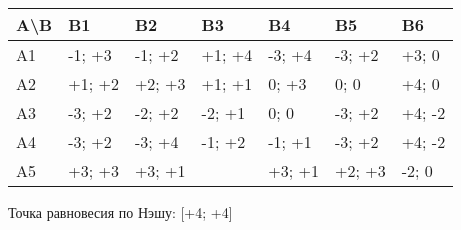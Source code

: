 \documentclass[12pt,a4paper]{article}
\begin{document}
\begin{table}[H]
        \centering
        
\begin{tabular}{|p{}|p{}|p{}|p{}|p{}|p{}|p{}|}
\hline 
 \textcolor[rgb]{0.82,0.01,0.11}{A}\textbackslash \textcolor[rgb]{0.29,0.56,0.89}{B} & \textcolor[rgb]{0.29,0.56,0.89}{B1} & \textcolor[rgb]{0.29,0.56,0.89}{B2} & \textcolor[rgb]{0.29,0.56,0.89}{B3} & \textcolor[rgb]{0.29,0.56,0.89}{B4} & \textcolor[rgb]{0.29,0.56,0.89}{B5} & \textcolor[rgb]{0.29,0.56,0.89}{B6} \\
\hline 
 \textcolor[rgb]{0.82,0.01,0.11}{A1} & -1; +3 & -1; +2 & +1; +4 & -3; +4 & -3; +2 & +3; 0 \\
\hline 
 \textcolor[rgb]{0.82,0.01,0.11}{A2} & +1; +2 & +2; +3 & +1; +1 & 0; +3 & 0; 0 & +4; 0 \\
\hline 
 \textcolor[rgb]{0.82,0.01,0.11}{A3} & -3; +2 & -2; +2 & -2; +1 & 0; 0 & -3; +2 & +4; -2 \\
\hline 
 \textcolor[rgb]{0.82,0.01,0.11}{A4} & -3; +2 & -3; +4 & -1; +2 & -1; +1 & -3; +2 & +4; -2 \\
\hline 
 \textcolor[rgb]{0.82,0.01,0.11}{A5} & +3; +3 & +3; +1 & \cellcolor{yellow!50}{+4; +4} & +3; +1 & +2; +3 & -2; 0 \\
 \hline
\end{tabular}
        
        \end{table}
        
Точка равновесия по Нэшу: [+4; +4]
    
\end{document}
